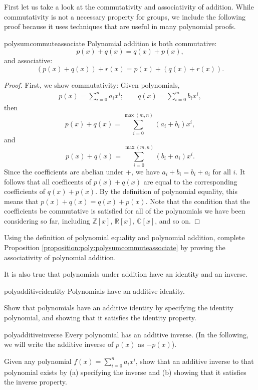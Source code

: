 First let us take a look at the commutativity and associativity of addition.  While commutativity is not a necessary property for groups, we include the following proof because it uses techniques that are useful in many polynomial proofs.

\begin {prop}{polysumcommuteassociate} Polynomial addition is both commutative: 
	\[p(x)+q(x) = q(x) + p(x),\]	
and associative:	
	\[(p(x) + q(x)) + r(x)  = p(x) + (q(x) + r(x)).\]	
\end {prop}
\begin {proof}{}
First, we show commutativity:	
Given polynomials,
\begin{align*}
p(x)  = \sum^{n}_{i=0} a_i x^i; \qquad
q(x)  = \sum^{m}_{i=0} b_i x^i,
\end{align*}	
then 
\[
p(x) + q(x) =  \sum_{i=0}^{\max(m,n)} (a_i + b_i) x^i,
\]
and
\[
p(x) + q(x) =  \sum_{i=0}^{\max(m,n)} (b_i + a_i) x^i.
\]
Since the coefficients are abelian under +, we have $a_i + b_i = b_i + a_i$ for all $i$. It follows that all coefficents of $p(x) + q(x)$ are equal to the corresponding coefficients of $q(x) + p(x)$. By the definition of polynomial equality, this means that 
$p(x) + q(x) = q(x) + p(x)$.  Note that the condition that the coefficients be commutative is satisfied for all of the polynomials we have been considering so far, including $\mathbb{Z}[x]$, $\mathbb{R}[x]$, $\mathbb{C}[x]$, and so on.

\end {proof}

\begin {exercise}{}
Using the definition of polynomial equality and polynomial addition, complete Proposition \ref{proposition:poly:polysumcommuteassociate} by proving the associativity of polynomial addition.
\end {exercise}

It is also true that polynomials under addition have an identity and an inverse.

\begin {prop}{polyadditiveidentity} Polynomials have an additive identity.
\end{prop}
\begin{exercise}{}
Show that polynomials have an additive identity by specifying the identity polynomial, and showing that it satisfies the identity property.
\end{exercise}

\begin{prop}{polyadditiveinverse} Every polynomial has an additive inverse.  (In the following, we will write the additive inverse of $p(x)$ as $-p(x)$).
\end{prop}
\begin{exercise}{}
Given any polynomial $f(x) = \sum_{i=0}^{n} a_i x^i$, show that an additive inverse to that polynomial exists by (a) specifying the inverse and (b) showing that it satisfies the inverse property.
\end{exercise}

